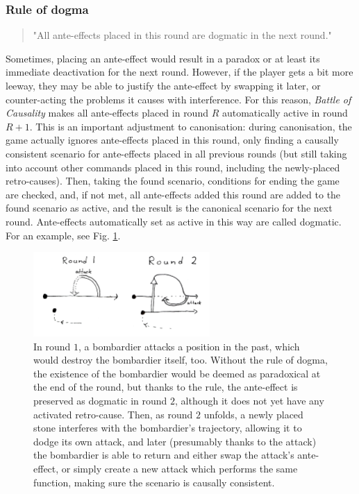 \documentclass[12pt]{article}
\begin{document}
	\subsubsection{Rule of dogma}\label{sec:rule of dogma}
	\begin{quote}
	"All ante-effects placed in this round are dogmatic in the next round."
	\end{quote}
	
	Sometimes, placing an ante-effect would result in a paradox or at least its immediate deactivation for the next round. However, if the player gets a bit more leeway, they may be able to justify the ante-effect by swapping it later, or counter-acting the problems it causes with interference. For this reason, \textit{Battle of Causality} makes all ante-effects placed in round $R$ automatically active in round $R+1$. This is an important adjustment to canonisation: during canonisation, the game actually ignores ante-effects placed in this round, only finding a causally consistent scenario for ante-effects placed in all previous rounds (but still taking into account other commands placed in this round, including the newly-placed retro-causes). Then, taking the found scenario, conditions for ending the game are checked, and, if not met, all ante-effects added this round are added to the found scenario as active, and the result is the canonical scenario for the next round. Ante-effects automatically set as active in this way are called dogmatic. For an example, see Fig. \ref{fig:dogma}.
	
	\begin{figure}[h]
\begin{center}
    \includegraphics[width=0.6\textwidth]{images/diag_dogma}
 \caption{In round $1$, a bombardier attacks a position in the past, which would destroy the bombardier itself, too. Without the rule of dogma, the existence of the bombardier would be deemed as paradoxical at the end of the round, but thanks to the rule, the ante-effect is preserved as dogmatic in round $2$, although it does not yet have any activated retro-cause. Then, as round $2$ unfolds, a newly placed stone interferes with the bombardier's trajectory, allowing it to dodge its own attack, and later (presumably thanks to the attack) the bombardier is able to return and either swap the attack's ante-effect, or simply create a new attack which performs the same function, making sure the scenario is causally consistent.}\label{fig:dogma}
\end{center}
\end{figure}
	
\end{document}
